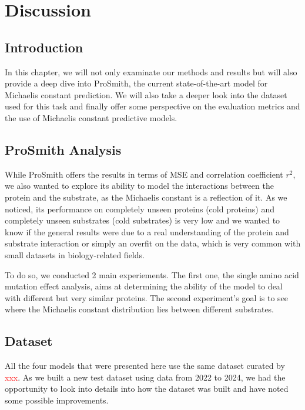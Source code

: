 
\chapter{Discussion}
\label{chap:6}

\section{Introduction}

In this chapter, we will not only examinate our methods and results but will also provide a deep dive into
ProSmith, the current state-of-the-art model for Michaelis constant prediction. We will also take a deeper look
into the dataset used for this task and finally offer some perspective on the evaluation metrics and the use
of Michaelis constant predictive models.

\section{ProSmith Analysis}

While ProSmith offers the results in terms of MSE and correlation coefficient $r^2$, we also wanted to 
explore its ability to model the interactions between the protein and the substrate, as the Michaelis constant
is a reflection of it. As we noticed, its performance on completely unseen proteins (cold proteins) and
completely unseen substrates (cold substrates) is very low and we wanted to know if the general results were
due to a real understanding of the protein and substrate interaction or simply an overfit on the data, which
is very common with small datasets in biology-related fields.

To do so, we conducted 2 main experiements. The first one, the single amino acid mutation effect analysis,
aims at determining the ability of the model to deal with different but very similar proteins. 
The second experiment's goal is to see where the Michaelis constant distribution lies between different 
substrates.

\section{Dataset}

All the four models that were presented here use the same dataset curated by \textcolor{red}{xxx}. As we 
built a new test dataset using data from 2022 to 2024, we had the opportunity to look into details into how
the dataset was built and have noted some possible improvements.

